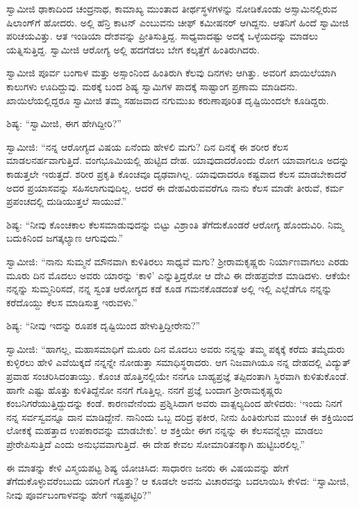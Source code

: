  ಸ್ವಾಮೀಜಿ ಢಾಕಾದಿಂದ ಚಂದ್ರನಾಥ, ಕಾಮಾಖ್ಯ ಮುಂತಾದ ತೀರ್ಥಸ್ಥಳಗಳನ್ನು ನೋಡಿಕೊಂಡು ಅಸ್ಸಾಮಿನಲ್ಲಿರುವ ಷಿಲಾಂಗ್‍ಗೆ ಹೋದರು. ಅಲ್ಲಿ ಹೆನ್ರಿ ಕಾಟನ್ ಎಂಬುವನು ಚೀಫ್ ಕಮೀಷನರ್ ಆಗಿದ್ದನು. ಆತನಿಗೆ ಹಿಂದೆ ಸ್ವಾಮೀಜಿ ಪರಿಚಯವಿತ್ತು. ಆತ ಇಂಡಿಯಾ ದೇಶವನ್ನು ಪ್ರೀತಿಸುತ್ತಿದ್ದ. ಸಾಧ್ಯವಾದಷ್ಟು ಅದಕ್ಕೆ ಒಳ್ಳೆಯದನ್ನು ಮಾಡಲು ಯತ್ನಿಸುತ್ತಿದ್ದ. ಸ್ವಾಮೀಜಿ ಆರೋಗ್ಯ ಅಲ್ಲಿ ಹದಗೆಡಲು ಬೇಗ ಕಲ್ಕತ್ತೆಗೆ ಹಿಂತಿರುಗಿದರು. 

 ಸ್ವಾಮೀಜಿ ಪೂರ್ವ ಬಂಗಾಳ ಮತ್ತು ಅಸ್ಸಾಂನಿಂದ ಹಿಂತಿರುಗಿ ಕೆಲವು ದಿನಗಳು ಆಗಿತ್ತು. ಅವರಿಗೆ ಖಾಯಿಲೆಯಾಗಿ ಕಾಲುಗಳು ಊದಿದ್ದುವು. ಮಠಕ್ಕೆ ಬಂದ ಶಿಷ್ಯ ಸ್ವಾಮಿಗಳ ಪಾದಕ್ಕೆ ಸಾಷ್ಟಾಂಗ ಪ್ರಣಾಮ ಮಾಡಿದನು. ಖಾಯಿಲೆಯಲ್ಲಿದ್ದರೂ ಸ್ವಾಮೀಜಿ ತಮ್ಮ ಸಹಜವಾದ ನಗುಮುಖ ಕರುಣಾಪೂರಿತ ದೃಷ್ಟಿಯಿಂದಲೇ ಕೂಡಿದ್ದರು. 

 ಶಿಷ್ಯ: “ಸ್ವಾಮೀಜಿ, ಈಗ ಹೇಗಿದ್ದೀರಿ?” 

 ಸ್ವಾಮೀಜಿ: “ನನ್ನ ಆರೋಗ್ಯದ ವಿಷಯ ಏನೆಂದು ಹೇಳಲಿ ಮಗು? ದಿನ ದಿನಕ್ಕೆ ಈ ಶರೀರ ಕೆಲಸ ಮಾಡಲನರ್ಹವಾಗುತ್ತಿದೆ. ವಂಗಭೂಮಿಯಲ್ಲಿ ಹುಟ್ಟಿದ ದೇಹ. ಯಾವುದಾದರೊಂದು ರೋಗ ಯಾವಾಗಲೂ ಅದನ್ನು ಕಾಡುತ್ತಲೇ ಇರುತ್ತದೆ. ಶರೀರ ಪ್ರಕೃತಿ ಕೊಂಚವೂ ದೃಢವಾಗಿಲ್ಲ. ಯಾವುದಾದರೂ ಕಷ್ಟವಾದ ಕೆಲಸ ಮಾಡಬೇಕಾದರೆ ಅದರ ಪ್ರಯಾಸವನ್ನು ಸಹಿಸಲಾಗುವುದಿಲ್ಲ. ಆದರೆ ಈ ದೇಹವಿರುವವರೆಗೂ ನಾನು ಕೆಲಸ ಮಾಡೇ ತೀರುವೆ, ಕರ್ಮ ಪ್ರಪಂಚದಲ್ಲಿ ದುಡಿಯುತ್ತಲೆ ಸಾಯುವೆ.” 

 ಶಿಷ್ಯ: “ನೀವು ಕೊಂಚಕಾಲ ಕೆಲಸಮಾಡುವುದನ್ನು ಬಿಟ್ಟು ವಿಶ್ರಾಂತಿ ತೆಗೆದುಕೊಂಡರೆ ಆರೋಗ್ಯ ಹೊಂದುವಿರಿ. ನಿಮ್ಮ ಬದುಕಿನಿಂದ ಜಗತ್ಕಲ್ಯಾಣ ಆಗುವುದು.” 

 ಸ್ವಾಮೀಜಿ: “ನಾನು ಸುಮ್ಮನೆ ಮೌನವಾಗಿ ಕುಳಿತಿರಲು ಸಾಧ್ಯವೆ ಮಗು? ಶ‍್ರೀರಾಮಕೃಷ್ಣರು ನಿರ್ಯಾಣವಾಗಲು ಎರಡು ಮೂರು ದಿನ ಮೊದಲು ಅವರು ಯಾರನ್ನು ‘ಕಾಳಿ’ ಎನ್ನುತ್ತಿದ್ದರೋ ಆ ದೇವಿ ಈ ದೇಹಪ್ರವೇಶ ಮಾಡಿದಳು. ಆಕೆಯೇ ನನ್ನನ್ನು ಸುಮ್ಮನಿರಿಸದೆ, ನನ್ನ ಸ್ವಂತ ಆರೋಗ್ಯದ ಕಡೆ ಕೂಡ ಗಮನಕೊಡದಂತೆ ಅಲ್ಲಿ ಇಲ್ಲಿ ಎಲ್ಲೆಡೆಗೂ ನನ್ನನ್ನು ಕರೆದೊಯ್ದು ಕೆಲಸ ಮಾಡಿಸುತ್ತ ಇರುವಳು.” 

 ಶಿಷ್ಯ: “ನೀವು ಇದನ್ನು ರೂಪಕ ದೃಷ್ಟಿಯಿಂದ ಹೇಳುತ್ತಿದ್ದೀರೇನು?” 

 ಸ್ವಾಮೀಜಿ: “ಹಾಗಲ್ಲ, ಮಹಾಸಮಾಧಿಗೆ ಮೂರು ದಿನ ಮೊದಲು ಅವರು ನನ್ನನ್ನು ತಮ್ಮ ಪಕ್ಕಕ್ಕೆ ಕರೆದು ತಮ್ಮೆದುರು ಕುಳ್ಳಿರಲು ಹೇಳಿ ಎವೆಯಿಕ್ಕದೆ ನನ್ನನ್ನೇ ನೋಡುತ್ತಾ ಸಮಾಧಿಸ್ಥರಾದರು. ಆಗ ನಿಜವಾಗಿಯೂ ನನ್ನ ದೇಹದಲ್ಲಿ ವಿದ್ಯುತ್ ಪ್ರವಾಹ ಸಂಚರಿಸಿದಂತಾಯ್ತು. ಕೊಂಚ ಹೊತ್ತಿನಲ್ಲಿಯೇ ನನಗೂ ಬಾಹ್ಯಪ್ರಜ್ಞೆ ತಪ್ಪಿದಂತಾಗಿ ಸ್ಥಿರವಾಗಿ ಕುಳಿತುಕೊಂಡೆ. ಹಾಗೇ ಎಷ್ಟು ಹೊತ್ತು ಕುಳಿತಿದ್ದೆನೋ ನನಗೆ ಗೊತ್ತಿಲ್ಲ. ನನಗೆ ಪ್ರಜ್ಞೆ ಬಂದಾಗ ಶ‍್ರೀರಾಮಕೃಷ್ಣರು ಕಂಬನಿಗರೆಯುತ್ತಿದ್ದುದನ್ನು ಕಂಡೆ. ಕಾರಣವೇನೆಂದು ಪ್ರಶ್ನಿಸಿದಾಗ ಅವರು ವಾತ್ಸಲ್ಯದಿಂದ ಹೇಳಿದರು: ‘ಇಂದು ನಿನಗೆ ನನ್ನ ಸರ್ವಸ್ವವನ್ನೂ ದಾನ ಮಾಡಿದ್ದೇನೆ. ನಾನಿಂದು ಒಬ್ಬ ದರಿದ್ರ ಫಕೀರ, ನೀನು ಹಿಂತಿರುಗುವ ಮುಂಚೆ ಈ ಶಕ್ತಿಯಿಂದ ಲೋಕಕ್ಕೆ ಮಹತ್ತಾದ ಉಪಕಾರವನ್ನು ಮಾಡಬೇಕು’. ಆ ಶಕ್ತಿಯೇ ಈಗ ನನ್ನನ್ನು ಈ ಕೆಲಸವನ್ನೆಲ್ಲಾ ಮಾಡಲು ಪ್ರೇರೇಪಿಸುತ್ತಿದೆ ಎಂದು ಅನುಭವವಾಗುತ್ತಿದೆ. ಈ ದೇಹ ಕೇವಲ ಸೋಮಾರಿತನಕ್ಕಾಗಿ ಹುಟ್ಟಿಬರಲಿಲ್ಲ.” 

\newpage

 ಈ ಮಾತನ್ನು ಕೇಳಿ ವಿಸ್ಮಯಪಟ್ಟ ಶಿಷ್ಯ ಯೋಚಿಸಿದ: ಸಾಧಾರಣ ಜನರು ಈ ವಿಷಯವನ್ನು ಹೇಗೆ ತೆಗೆದುಕೊಳ್ಳುವರೆಂಬುದು ಯಾರಿಗೆ ಗೊತ್ತು? ಆ ಕೂಡಲೇ ಅವನು ವಿಚಾರವನ್ನು ಬದಲಾಯಿಸಿ ಕೇಳಿದ: “ಸ್ವಾಮೀಜಿ, ನೀವು ಪೂರ್ವಬಂಗಾಳವನ್ನು ಹೇಗೆ ಇಷ್ಟಪಟ್ಟಿರಿ?” 

